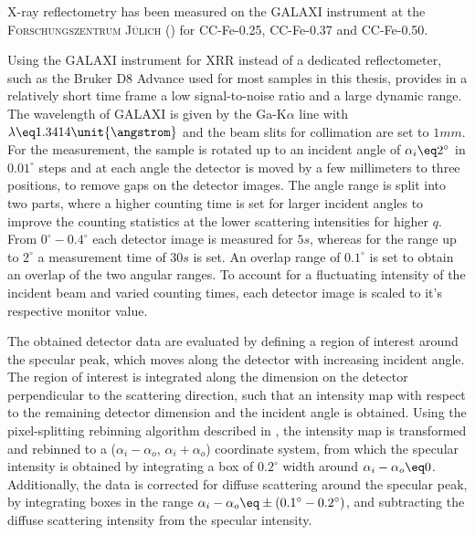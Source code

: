 \documentclass[\main/dresen_thesis.tex]{subfiles}
\begin{document}
    X-ray reflectometry has been measured on the GALAXI instrument at the \textsc{Forschungszentrum J\"ulich} () for CC-Fe-0.25, CC-Fe-0.37 and CC-Fe-0.50.

    Using the GALAXI instrument for XRR instead of a dedicated reflectometer, such as the Bruker D8 Advance used for most samples in this thesis, provides in a relatively short time frame a low signal-to-noise ratio and a large dynamic range.
    The wavelength of GALAXI is given by the Ga-K$\alpha$ line with $\lambda \eq 1.3414 \unit{\angstrom}$ and the beam slits for collimation are set to $1 \unit{mm}$.
    For the measurement, the sample is rotated up to an incident angle of $\alpha_i \eq 2^\circ$ in $0.01 ^\circ$ steps and at each angle the detector is moved by a few millimeters to three positions, to remove gaps on the detector images.
    The angle range is split into two parts, where a higher counting time is set for larger incident angles to improve the counting statistics at the lower scattering intensities for higher $q$.
    From $0 ^\circ - 0.4 ^\circ$ each detector image is measured for $5 \unit{s}$, whereas for the range up to $2 ^\circ$ a measurement time of $30 \unit{s}$ is set.
    An overlap range of $0.1 ^\circ$ is set to obtain an overlap of the two angular ranges.
    To account for a fluctuating intensity of the incident beam and varied counting times, each detector image is scaled to it's respective monitor value.

    The obtained detector data are evaluated by defining a region of interest around the specular peak, which moves along the detector with increasing incident angle.
    The region of interest is integrated along the dimension on the detector perpendicular to the scattering direction, such that an intensity map with respect to the remaining detector dimension and the incident angle is obtained.
    Using the pixel-splitting rebinning algorithm described in , the intensity map is transformed and rebinned to a ($\alpha_i - \alpha_o$, $\alpha_i+\alpha_o$) coordinate system, from which the specular intensity is obtained by integrating a box of $0.2 ^\circ$ width around $\alpha_i - \alpha_o \eq 0$.
    Additionally, the data is corrected for diffuse scattering around the specular peak, by integrating boxes in the range $\alpha_i - \alpha_o \eq \pm (0.1^\circ - 0.2^\circ)$, and subtracting the diffuse scattering intensity from the specular intensity.
\end{document}
